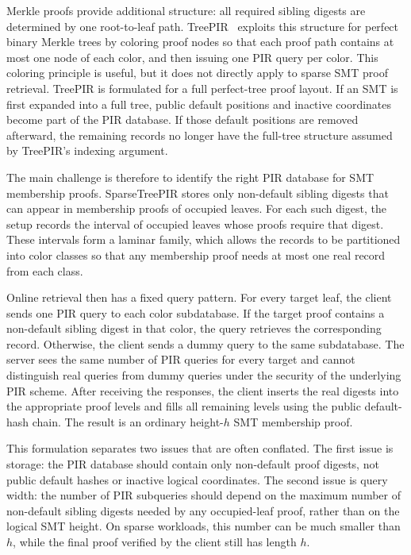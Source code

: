 Merkle proofs provide additional structure: all required sibling digests are determined by one root-to-leaf path. TreePIR~\cite{treepir} exploits this structure for perfect binary Merkle trees by coloring proof nodes so that each proof path contains at most one node of each color, and then issuing one PIR query per color. This coloring principle is useful, but it does not directly apply to sparse SMT proof retrieval. TreePIR is formulated for a full perfect-tree proof layout. If an SMT is first expanded into a full tree, public default positions and inactive coordinates become part of the PIR database. If those default positions are removed afterward, the remaining records no longer have the full-tree structure assumed by TreePIR's indexing argument.

The main challenge is therefore to identify the right PIR database for SMT membership proofs. SparseTreePIR stores only non-default sibling digests that can appear in membership proofs of occupied leaves. For each such digest, the setup records the interval of occupied leaves whose proofs require that digest. These intervals form a laminar family, which allows the records to be partitioned into color classes so that any membership proof needs at most one real record from each class.

Online retrieval then has a fixed query pattern. For every target leaf, the client sends one PIR query to each color subdatabase. If the target proof contains a non-default sibling digest in that color, the query retrieves the corresponding record. Otherwise, the client sends a dummy query to the same subdatabase. The server sees the same number of PIR queries for every target and cannot distinguish real queries from dummy queries under the security of the underlying PIR scheme. After receiving the responses, the client inserts the real digests into the appropriate proof levels and fills all remaining levels using the public default-hash chain. The result is an ordinary height-$h$ SMT membership proof.

This formulation separates two issues that are often conflated. The first issue is storage: the PIR database should contain only non-default proof digests, not public default hashes or inactive logical coordinates. The second issue is query width: the number of PIR subqueries should depend on the maximum number of non-default sibling digests needed by any occupied-leaf proof, rather than on the logical SMT height. On sparse workloads, this number can be much smaller than $h$, while the final proof verified by the client still has length $h$.

